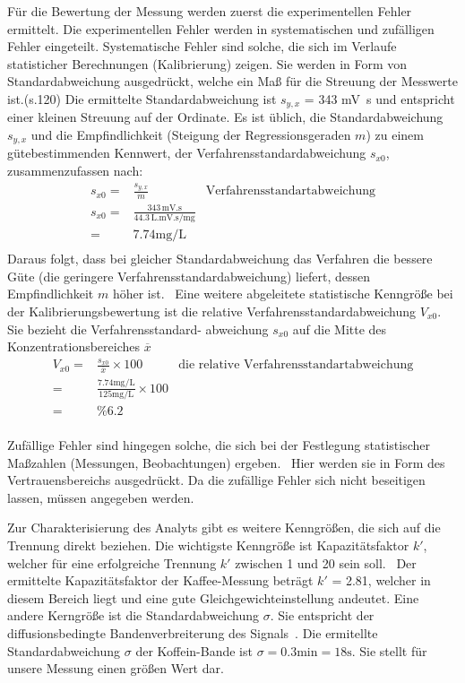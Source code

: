 \documentclass{article}
\begin{document}
%
%

\noindent
{}
Für die Bewertung der Messung werden zuerst die experimentellen Fehler ermittelt.
Die experimentellen Fehler werden in systematischen und zufälligen Fehler eingeteilt.
Systematische Fehler sind solche, die sich im Verlaufe statisticher Berechnungen (Kalibrierung) zeigen.
Sie werden in Form von Standardabweichung ausgedrückt, welche ein Maß für die Streuung der Messwerte ist.(s.120)
 Die ermittelte Standardabweichung ist $s_{y,x}$ = 343 \si{\milli\volt.\second} und entspricht einer kleinen Streuung
auf der Ordinate.
 Es ist üblich, die Standardabweichung $s_{y,x}$ und die Empfindlichkeit (Steigung der
Regressionsgeraden $m$) zu einem gütebestimmenden Kennwert, der Verfahrensstandardabweichung
$s_{x0}$, zusammenzufassen nach:
 \begin{align*}
     s_{x0}=&\frac{s_{y,x}}{m} & \text{Verfahrensstandartabweichung} \\
s_{x0}=&\frac{343 \, \si{\milli\volt.\second}}{44.3 \, \si{\liter.\milli\volt.\second\per\milli\gram}}&\\
 =& 7.74 \si{\milli\gram\per\liter}& \\
  \end{align*}
  Daraus folgt, dass bei gleicher Standardabweichung das Verfahren die bessere
Güte (die geringere Verfahrensstandardabweichung) liefert, dessen Empfindlichkeit $m$
höher ist.~\cite{statistik}
  Eine weitere abgeleitete statistische Kenngröße bei der Kalibrierungsbewertung ist
die relative Verfahrensstandardabweichung $V_{x0}$. Sie bezieht die Verfahrensstandard-
abweichung $s_{x0}$ auf die Mitte des Konzentrationsbereiches $\overline{x}$
  \begin{align*}
 V_{x0}=&\frac{s_{x0}}{\overline{x}}\times 100 &\text{die relative Verfahrensstandartabweichung}\\
 = &\frac{7.74 \si{\milli\gram\per\liter}}{125 \si{\milli\gram\per\liter}}\times 100 & \\
 =& \%6.2 &\\
   \end{align*}

Zufällige Fehler sind hingegen solche, die sich bei der Festlegung statistischer Maßzahlen
 (Messungen, Beobachtungen) ergeben.~\cite{estatistik}
Hier werden sie in Form des Vertrauensbereichs ausgedrückt.
Da die zufällige Fehler sich nicht beseitigen lassen, müssen angegeben werden.

Zur Charakterisierung des Analyts gibt es weitere Kenngrößen, die sich auf die Trennung direkt beziehen.
Die wichtigste Kenngröße ist Kapazitätsfaktor $k'$, welcher für eine erfolgreiche Trennung $k'$ zwischen 1 und 20 sein soll.~\cite{harris}
Der ermittelte Kapazitätsfaktor der Kaffee-Messung beträgt $k'$ = 2.81, welcher in diesem Bereich liegt und eine gute Gleichgewichteinstellung andeutet.
Eine andere Kerngröße ist die Standardabweichung $\sigma$. Sie entspricht der diffusionsbedingte Bandenverbreiterung des Signals~\cite{harris}.
Die ermitellte Standardabweichung $\sigma$ der Koffein-Bande ist $\sigma = 0.3 \si{\minute} = 18 \si{\second}$.
Sie stellt für unsere Messung einen größen Wert dar.
\end{document}

